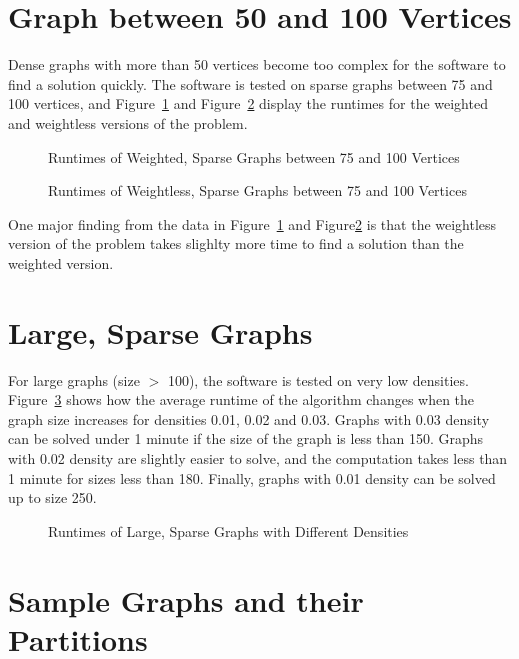 \documentclass[a4paper,12pt]{report}
\begin{document}
\section{Graph between 50 and 100 Vertices}

Dense graphs with more than 50 vertices become too complex for the software to find a solution quickly. The software is tested on sparse graphs between 75 and 100 vertices, and Figure~\ref{fig:p4} and Figure~\ref{fig:p5} display the runtimes for the weighted and weightless versions of the problem. 

\begin{figure}[ht]
	\centering
	
	\caption{Runtimes of Weighted, Sparse Graphs between 75 and 100 Vertices}
	\label{fig:p4}
\end{figure}

\begin{figure}[ht]
	\centering
	
\caption{Runtimes of Weightless, Sparse Graphs between 75 and 100 Vertices}
	\label{fig:p5}
\end{figure}

One major finding from the data in Figure~\ref{fig:p4} and Figure\ref{fig:p5} is that the weightless version of the problem takes slighlty more time to find a solution than the weighted version.

\section{Large, Sparse Graphs}

For large graphs (size \(>\) 100), the software is tested on very low densities. Figure~\ref{fig:p3} shows how the average runtime of the algorithm changes when the graph size increases for densities 0.01, 0.02 and 0.03. Graphs with 0.03 density can be solved under 1 minute if the size of the graph is less than 150. Graphs with 0.02 density are slightly easier to solve, and the computation takes less than 1 minute for sizes less than 180. Finally, graphs with 0.01 density can be solved up to size 250.

\begin{figure}[H]
	\centering
	
	\caption{Runtimes of Large, Sparse Graphs with Different Densities}
	\label{fig:p3}
\end{figure}


\section{Sample Graphs and their Partitions}
\end{document}
